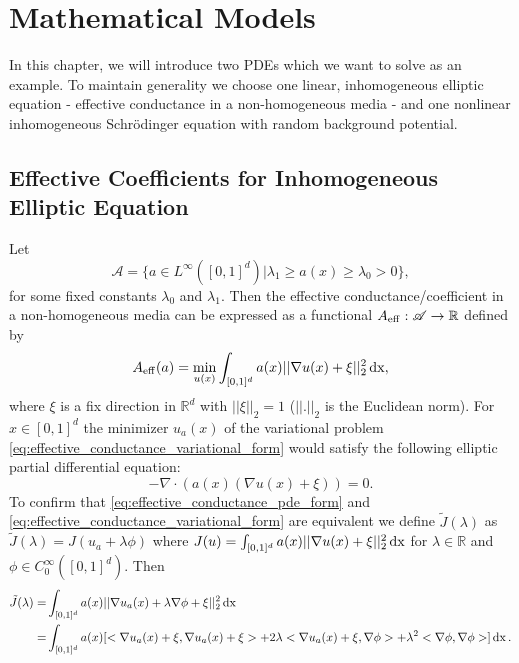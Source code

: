 \chapter{Mathematical Models}
In this chapter, we will introduce two PDEs which we want to solve as an example. To maintain generality we choose one linear, inhomogeneous elliptic equation - effective conductance in a non-homogeneous media - and one nonlinear inhomogeneous Schr\"{o}dinger equation with random background potential.
\section{Effective Coefficients for Inhomogeneous Elliptic Equation}
Let 
 \begin{equation}
 \label{def:coefficient_field_for_effective_conductance}
 \mathscr{A} = \{a\in L^{\infty}([0,1]^d) | \lambda_{1} \geq a(x) \geq \lambda_{0} > 0 \},
 \end{equation}
 for some fixed constants $\lambda_{0}$ and $\lambda_{1}$. Then the effective conductance/coefficient in a non-homogeneous media can be expressed as a functional $A_{\operatorname{eff}} : \mathscr{A} \to \mathbb{R}$ defined by
\begin{equation}
A_{\operatorname{eff}}(a) = \min_{u(x)} \int_{[0,1]^d} a(x) ||\nabla u(x) + \xi||_{2}^{2} \operatorname{dx}
\label{eq:effective_conductance_variational_form},
\end{equation}
where $\xi$ is a fix direction in $\mathbb{R}^d$ with $||\xi||_{2} = 1$ ($||.||_{2}$ is the Euclidean norm).
For $x\in [0,1]^{d}$ the minimizer $u_{a}(x)$ of the variational problem  \eqref{eq:effective_conductance_variational_form} would satisfy the following elliptic partial differential equation: 
\begin{equation}
-\nabla \cdot (a(x)(\nabla u(x)+\xi)) = 0 
\label{eq:effective_conductance_pde_form}.
\end{equation}
To confirm that \eqref{eq:effective_conductance_pde_form} and \eqref{eq:effective_conductance_variational_form} are equivalent we define $\tilde{J}(\lambda)$ as $\tilde{J}(\lambda) = J(u_{a}+\lambda\phi)$ where $J(u) = \int_{[0,1]^d} a(x) ||\nabla u(x) + \xi||_{2}^{2} \operatorname{dx} $ for $\lambda \in \mathbb{R}$ and $\phi \in C_{0}^{\infty}([0,1]^{d})$. Then 
\begin{equation}
\begin{aligned}
\tilde{J}(\lambda) = &\int_{[0,1]^d} a(x) ||\nabla u_{a}(x)+ \lambda\nabla\phi + \xi||_{2}^{2} \operatorname{dx} \\
= &\int_{[0,1]^d} a(x) [<\nabla u_{a}(x)+\xi,\nabla u_{a}(x)+\xi> + 2\lambda<\nabla u_{a}(x)+\xi, \nabla\phi> + \lambda^{2} <\nabla\phi,\nabla\phi>] \operatorname{dx}.
\end{aligned}
\label{eq:Jtilda}
\end{equation}
